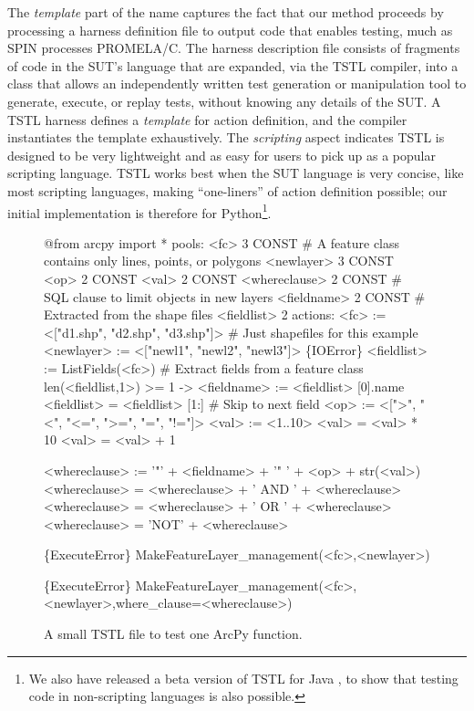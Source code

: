 The \emph{template} part of the name captures the fact that our method
proceeds by processing a harness definition file to output code that
enables testing, much  as SPIN processes PROMELA/C.  The harness
description file consists of fragments of code in the SUT's language
that are expanded, via the TSTL compiler, into a class that allows
an independently written test generation or manipulation tool to
generate, execute, or replay tests, without knowing
any details of the SUT.
A TSTL harness defines a \emph{template} for action definition, and
the compiler 
instantiates the template exhaustively.  The \emph{scripting} aspect indicates
TSTL is designed to be very lightweight and as easy for
users to pick up as a popular scripting language.  TSTL
works best when the SUT language is very
concise, like most scripting languages, making ``one-liners'' of action
definition possible; our initial implementation \cite{tstl} is therefore for
Python\footnote{We also have released a beta version of TSTL for Java \cite{TSTLJava}, to show
 that testing code in non-scripting languages is also possible.}.

\begin{figure}
{\scriptsize
\begin{code}
@from arcpy import *
\vspace{0.1in}
pools:
  <fc> 3 CONST             \# A feature class contains only lines, points, or polygons
  <newlayer> 3 CONST
  <op> 2 CONST 
  <val> 2 CONST
  <whereclause> 2 CONST    \# SQL clause to limit objects in new layers
  <fieldname> 2 CONST      \# Extracted from the shape files
  <fieldlist> 2
\vspace{0.1in}
actions:
\vspace{0.1in}
<fc> := <["d1.shp", "d2.shp", "d3.shp"]>  \# Just shapefiles for this example
<newlayer> := <["newl1", "newl2", "newl3"]>
\vspace{0.05in}
\{IOError\} <fieldlist> := ListFields(<fc>) \# Extract fields from a feature class
len(<fieldlist,1>) >= 1 -> <fieldname> := <fieldlist> [0].name 
<fieldlist> = <fieldlist> [1:] \# Skip to next field
\vspace{0.05in}
<op> := <[">", "<", "<=", ">=", "=", "!="]>
<val> := <1..10>
<val> = <val> * 10
<val> = <val> + 1

<whereclause> := '"' + <fieldname> + '" ' + <op> + str(<val>)
<whereclause> = <whereclause> + ' AND ' + <whereclause>
<whereclause> = <whereclause> + ' OR ' +  <whereclause>
<whereclause> = 'NOT' + <whereclause>

\{ExecuteError\} MakeFeatureLayer\_management(<fc>,<newlayer>)

\{ExecuteError\} MakeFeatureLayer\_management(<fc>,<newlayer>,where\_clause=<whereclause>)
\end{code}
}
\caption{A small TSTL file to test one ArcPy function.}
\label{fig:makefeaturelayer}
\end{figure}


